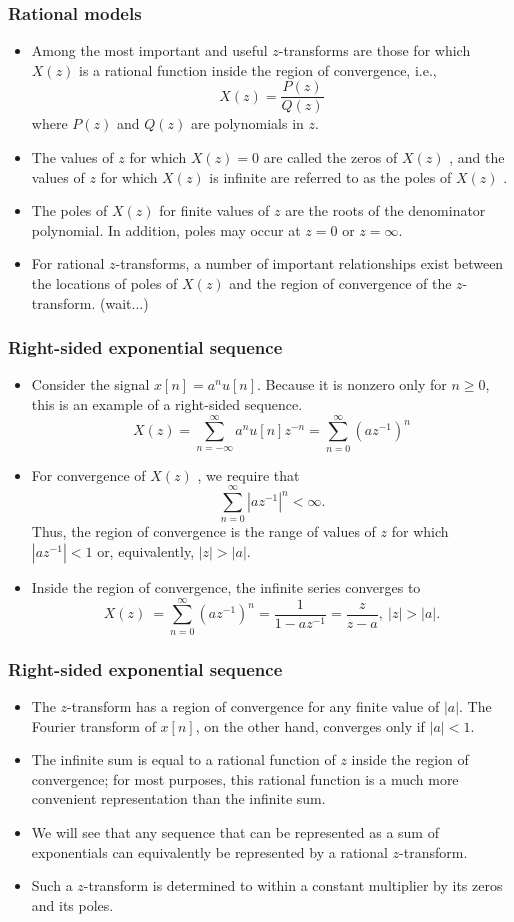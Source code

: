 \begin{frame}
\frametitle{Rational models}
\begin{itemize}
\item Among the most important and useful $z$-transforms are those for which $X(z)$ is a rational function inside the region of convergence, i.e.,
$$
X(z)=\frac{P(z)}{Q(z)}
$$
where $P(z)$ and $Q(z)$ are polynomials in $z$.
\item The values of $z$ for which $X(z)=0$ are called the \alert{zeros} of $X(z)$ , and the values of $z$ for which $X(z)$ is infinite are referred to as the \alert{poles} of $X(z)$ .
\item The poles of $X(z)$ for finite values of $z$ are the roots of the denominator polynomial. In addition, poles may occur at $z=0$ or $ z=\infty$.
\item For rational $z$-transforms, a number of important relationships exist between the locations of poles of $X(z)$ and the region of convergence of the $z$-transform. (\alert{wait...})
\end{itemize}
\end{frame}


\begin{frame}
\frametitle{Right-sided exponential sequence}
\begin{itemize}
\item Consider the signal $x[n]=a^{n}u[n]$. Because it is nonzero only for $n\geq 0$, this is an example of a \alert{right-sided} sequence.
$$
X(z)=\sum_{n=-\infty}^{\infty} a^{n}u[n]z^{-n}=\sum_{n=0}^{\infty}(az^{-1})^{n}
$$
\item For convergence of $X(z)$ , we require that
$$
\sum_{n=0}^{\infty}|az^{-1}|^{n}<\infty.
$$
Thus, the region of convergence is the range of values of $z$ for which $|az^{-1}|<1$ or, equivalently, $|z|>|a|$.
\item Inside the region of convergence, the infinite series converges to
$$
X(z)\ =\sum_{n=0}^{\infty}(az^{-1})^{n}=\frac{1}{1-az^{-1}}=\frac{z}{z-a},\ |z|>|a|.
$$
\end{itemize}
\end{frame}

\begin{frame}
\frametitle{Right-sided exponential sequence}
\begin{itemize}
\item The $z$-transform has a region of convergence for any finite value of $|a|$. The Fourier transform of $x[n]$, on the other hand, converges only if $|a|<1$.

\item The infinite sum is equal to a rational function of $z$ inside the region of convergence; for most purposes, this rational function is a much more convenient representation than the infinite sum.
\item We will see that any sequence that can be represented as a sum of exponentials can equivalently be represented by a rational $z$-transform.
\item Such a $z$-transform is determined to within a constant multiplier by its \alert{zeros} and its \alert{poles}.
\end{itemize}
\end{frame}



